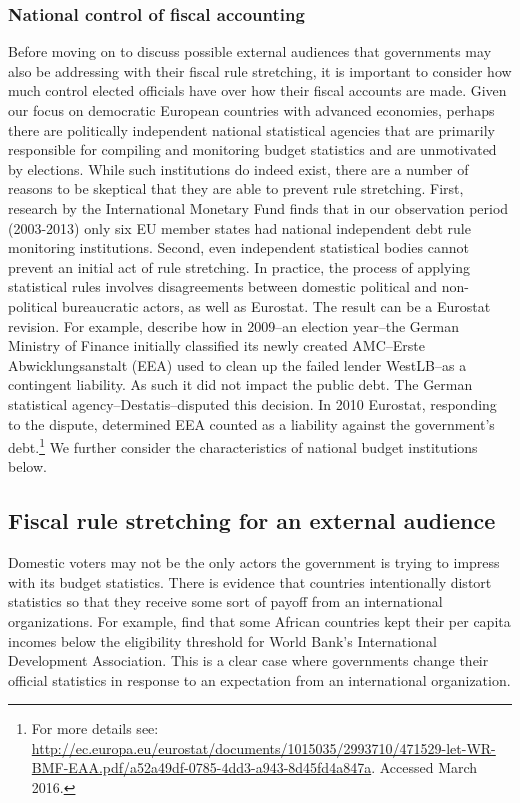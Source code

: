 \documentclass[]{article}
\begin{document}
\subsubsection{National control of fiscal accounting}

Before moving on to discuss possible external audiences that governments may also be addressing with their fiscal rule stretching, it is important to consider how much control elected officials have over how their fiscal accounts are made. Given our focus on democratic European countries with advanced economies, perhaps there are politically independent national statistical agencies that are primarily responsible for compiling and monitoring budget statistics and are unmotivated by elections. While such institutions do indeed exist, there are a number of reasons to be skeptical that they are able to  prevent rule stretching. First, research by the International Monetary Fund \citep{bova2015rules} finds that in our observation period (2003-2013) only six EU member states had national independent debt rule monitoring institutions. Second, even independent statistical bodies cannot prevent an initial act of rule stretching. In practice, the process of applying statistical rules involves disagreements between domestic political and non-political bureaucratic actors, as well as Eurostat. The result can be a Eurostat revision. For example, \cite{GandrudHallerberg2016} describe how in 2009--an election year--the German Ministry of Finance initially classified its newly created AMC--Erste Abwicklungsanstalt (EEA) used to clean up the failed lender WestLB--as a contingent liability. As such it did not impact the public debt. The German statistical agency--Destatis--disputed this decision. In 2010 Eurostat, responding to the dispute, determined EEA counted as a liability against the government's debt.\footnote{For more details see: \url{http://ec.europa.eu/eurostat/documents/1015035/2993710/471529-let-WR-BMF-EAA.pdf/a52a49df-0785-4dd3-a943-8d45fd4a847a}. Accessed March 2016.} We further consider the characteristics of national budget institutions below.

\subsection{Fiscal rule stretching for an external audience}

Domestic voters may not be the only actors the government is trying to impress with its budget statistics. There is evidence that countries intentionally distort statistics so that they receive some sort of payoff from an international organizations. For example, \cite{kerner2016} find that some African countries kept their per capita incomes below the eligibility threshold for World Bank’s International Development Association. This is a clear case where governments change their official statistics in response to an expectation from an international organization.
\end{document}
